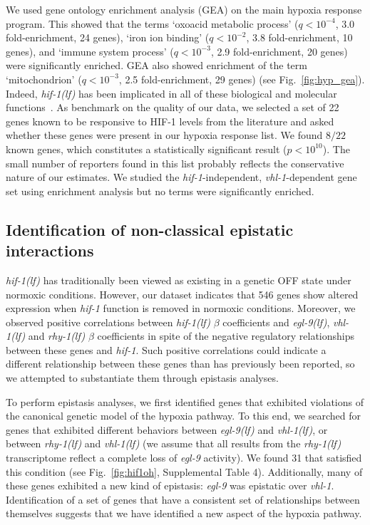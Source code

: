 \documentclass[10pt, onecolumn]{article}
\newcommand{\qval}[1]{$q<10^{-#1}$}
\newcommand{\gene}[1]{\emph{#1}}
\newcommand{\egl}{\emph{\mbox{egl-9}(lf)}}
\newcommand{\rhy}{\emph{\mbox{rhy-1}(lf)}}
\newcommand{\vhl}{\emph{\mbox{vhl-1}(lf)}}
\newcommand{\hif}{\emph{\mbox{hif-1(lf)}}}
\newcommand{\hifp}{HIF-1}
\newcommand{\hifn}{546}
\newcommand{\hifohtargets}{31}
\begin{document}
We used gene ontology enrichment analysis (GEA) on the main hypoxia response program.
This showed that the terms `oxoacid metabolic process' (\qval{4}, 3.0 fold-enrichment,
24 genes), `iron ion binding' (\qval{2}, 3.8 fold-enrichment, 10 genes), and `immune
system process' (\qval{3}, 2.9 fold-enrichment, 20 genes) were significantly enriched.
GEA also showed enrichment of the term `mitochondrion' (\qval{3}, 2.5 fold-enrichment,
29 genes) (see Fig.~\ref{fig:hyp_gea}). Indeed, \hif{} has been implicated in
all of these biological and molecular functions~\cite{Luhachack2012,Ackerman2012,
Romney2011,Semenza2011}.
As benchmark on the quality of our data, we selected a set of 22 genes known to
be responsive to \hifp{} levels from the literature and asked whether these genes
were present in our hypoxia response list. We found $8/22$ known genes, which
constitutes a statistically significant result ($p<10^{10}$). The small number of
reporters found in this list probably reflects the conservative nature of our
estimates.
We studied the \gene{hif-1}-independent, \gene{vhl-1}-dependent gene set
using enrichment analysis but no terms were significantly enriched.

\subsection*{Identification of non-classical epistatic interactions}
\label{sub:hifoh}
\hif{} has traditionally been viewed as existing in a genetic OFF state under
normoxic conditions. However, our dataset indicates that \hifn{} genes show
altered expression when \gene{hif-1} function is removed in normoxic conditions.
Moreover, we observed positive correlations between \hif{} $\beta$ coefficients
and \egl{}, \vhl{} and \rhy{} $\beta$ coefficients in spite of the negative
regulatory relationships between these genes and \gene{hif-1}. Such
positive correlations could indicate a different relationship between these genes
than has previously been reported, so we attempted to substantiate them through
epistasis analyses.

To perform epistasis analyses, we first identified genes that exhibited violations
of the canonical genetic model of the hypoxia pathway. To this end, we searched for
genes that exhibited different behaviors between \egl{} and \vhl{}, or
between \rhy{} and \vhl{} (we assume that all results from the
\rhy{} transcriptome reflect a complete loss of \gene{egl-9} activity). We found
\hifohtargets{} that satisfied this condition (see Fig.~\ref{fig:hif1oh},
Supplemental Table 4).
Additionally, many of these genes exhibited a new kind of epistasis:
\gene{egl-9} was epistatic over \gene{vhl-1}. Identification of a set of genes
that have a consistent set of relationships between themselves suggests that
we have identified a new aspect of the hypoxia pathway.
\end{document}
